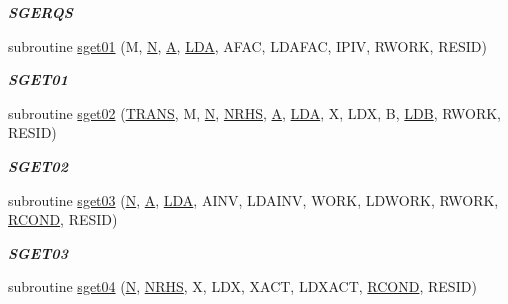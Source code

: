 \begin{DoxyCompactItemize}
\begin{DoxyCompactList}\small\item\em {\bfseries S\+G\+E\+R\+Q\+S} \end{DoxyCompactList}\item 
subroutine \hyperlink{group__single__lin_gace2d8f4183c1f31ee10f68a62319049a}{sget01} (M, \hyperlink{polmisc_8c_a0240ac851181b84ac374872dc5434ee4}{N}, \hyperlink{classA}{A}, \hyperlink{example__user_8c_ae946da542ce0db94dced19b2ecefd1aa}{L\+D\+A}, A\+F\+A\+C, L\+D\+A\+F\+A\+C, I\+P\+I\+V, R\+W\+O\+R\+K, R\+E\+S\+I\+D)
\begin{DoxyCompactList}\small\item\em {\bfseries S\+G\+E\+T01} \end{DoxyCompactList}\item 
subroutine \hyperlink{group__single__lin_ga3c268bce93f7da1dd297b590955402dd}{sget02} (\hyperlink{superlu__enum__consts_8h_a0c4e17b2d5cea33f9991ccc6a6678d62a1f61e3015bfe0f0c2c3fda4c5a0cdf58}{T\+R\+A\+N\+S}, M, \hyperlink{polmisc_8c_a0240ac851181b84ac374872dc5434ee4}{N}, \hyperlink{example__user_8c_aa0138da002ce2a90360df2f521eb3198}{N\+R\+H\+S}, \hyperlink{classA}{A}, \hyperlink{example__user_8c_ae946da542ce0db94dced19b2ecefd1aa}{L\+D\+A}, X, L\+D\+X, B, \hyperlink{example__user_8c_a50e90a7104df172b5a89a06c47fcca04}{L\+D\+B}, R\+W\+O\+R\+K, R\+E\+S\+I\+D)
\begin{DoxyCompactList}\small\item\em {\bfseries S\+G\+E\+T02} \end{DoxyCompactList}\item 
subroutine \hyperlink{group__single__lin_gae983f7c2eee86318e8aab52f5febe13a}{sget03} (\hyperlink{polmisc_8c_a0240ac851181b84ac374872dc5434ee4}{N}, \hyperlink{classA}{A}, \hyperlink{example__user_8c_ae946da542ce0db94dced19b2ecefd1aa}{L\+D\+A}, A\+I\+N\+V, L\+D\+A\+I\+N\+V, W\+O\+R\+K, L\+D\+W\+O\+R\+K, R\+W\+O\+R\+K, \hyperlink{superlu__enum__consts_8h_af00a42ecad444bbda75cde1b64bd7e72a9b5c151728d8512307565994c89919d5}{R\+C\+O\+N\+D}, R\+E\+S\+I\+D)
\begin{DoxyCompactList}\small\item\em {\bfseries S\+G\+E\+T03} \end{DoxyCompactList}\item 
subroutine \hyperlink{group__single__lin_ga93103b2e842fd8c55f6ac53b965314e1}{sget04} (\hyperlink{polmisc_8c_a0240ac851181b84ac374872dc5434ee4}{N}, \hyperlink{example__user_8c_aa0138da002ce2a90360df2f521eb3198}{N\+R\+H\+S}, X, L\+D\+X, X\+A\+C\+T, L\+D\+X\+A\+C\+T, \hyperlink{superlu__enum__consts_8h_af00a42ecad444bbda75cde1b64bd7e72a9b5c151728d8512307565994c89919d5}{R\+C\+O\+N\+D}, R\+E\+S\+I\+D)

\end{DoxyCompactItemize}
